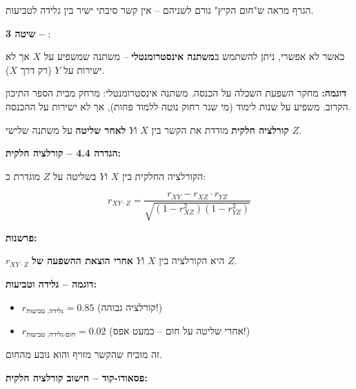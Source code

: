 הגרף מראה ש"חום הקיץ" גורם לשניהם – אין קשר סיבתי ישיר בין גלידה לטביעות.

\textbf{שיטה \num{3} – }:

כאשר  לא אפשרי, ניתן להשתמש ב\textbf{משתנה אינסטרומנטלי} – משתנה שמשפיע על $X$ אך לא ישירות על $Y$ (רק דרך $X$).

\textbf{דוגמה:} מחקר השפעת השכלה על הכנסה. משתנה אינסטרומנטלי: מרחק מבית הספר התיכון הקרוב. משפיע על שנות לימוד (מי שגר רחוק נוטה ללמוד פחות), אך לא ישירות על ההכנסה.


\textbf{קורלציה חלקית}  מודדת את הקשר בין $X$ ו\en{-}$Y$ \textbf{לאחר שליטה} על משתנה שלישי $Z$.

\textbf{הגדרה \num{4.4} – קורלציה חלקית:}

הקורלציה החלקית בין $X$ ו\en{-}$Y$ בשליטה על $Z$ מוגדרת כ:

\begin{equation}
r_{XY \cdot Z} = \frac{r_{XY} - r_{XZ} \cdot r_{YZ}}{\sqrt{(1 - r_{XZ}^2)(1 - r_{YZ}^2)}}
\end{equation}

\textbf{פרשנות:}

$r_{XY \cdot Z}$ היא הקורלציה בין $X$ ו\en{-}$Y$ \textbf{אחרי הוצאת ההשפעה של} $Z$.

\textbf{דוגמה – גלידה וטביעות:}

\begin{itemize}
\item $r_{\text{גלידה, טביעות}} = 0.85$ (קורלציה גבוהה!)
\item $r_{\text{גלידה, טביעות} \cdot \text{חום}} = 0.02$ (אחרי שליטה על חום – כמעט אפס!)
\end{itemize}

זה מוכיח שהקשר מזויף והוא נובע מהחום.

\textbf{פסאודו-קוד – חישוב קורלציה חלקית:}

